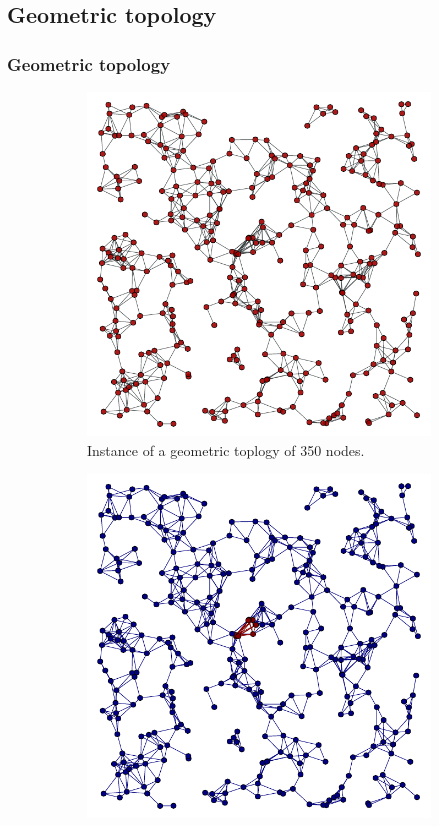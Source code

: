 \documentclass{beamer}
\begin{document}
\subsection{Geometric topology}
\begin{frame}
\frametitle{Geometric topology}
\begin{figure}[t]
	\centering
	\begin{subfigure}[h]{0.4\textwidth}
		\includegraphics[width=\linewidth]{Figure/geometric.pdf}
		\caption{\footnotesize{Instance of a geometric toplogy of 350 nodes.}}\label{fig:Geo}
	\end{subfigure}%
	\hspace{20pt}
	\begin{subfigure}[h]{0.4\textwidth}
		\includegraphics[width=\linewidth]{Figure/geo-sub_fully_connected.pdf}

\end{subfigure}
\end{figure}
\end{frame}
\end{document}
